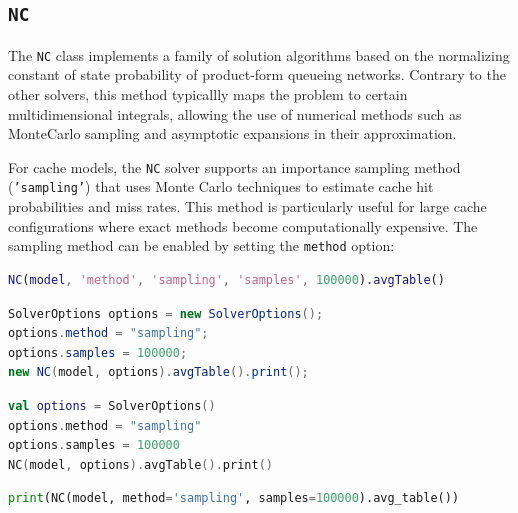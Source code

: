 \subsection{\texttt{NC}}
The \texttt{NC} class implements a family of solution algorithms based on the normalizing constant of state probability of product-form queueing networks. Contrary to the other solvers, this method typicallly maps the problem to certain multidimensional integrals, allowing the use of numerical methods such as MonteCarlo sampling and asymptotic expansions in their approximation.

For cache models, the \texttt{NC} solver supports an importance sampling method (\texttt{'sampling'}) that uses Monte Carlo techniques to estimate cache hit probabilities and miss rates. This method is particularly useful for large cache configurations where exact methods become computationally expensive. The sampling method can be enabled by setting the \texttt{method} option:
\begin{MATLAB}
\begin{lstlisting}[language = matlab]
NC(model, 'method', 'sampling', 'samples', 100000).avgTable()
\end{lstlisting}
\end{MATLAB}
\begin{JAVA}
\begin{lstlisting}[language=java, basicstyle=\ttfamily\scriptsize]
SolverOptions options = new SolverOptions();
options.method = "sampling";
options.samples = 100000;
new NC(model, options).avgTable().print();
\end{lstlisting}
\end{JAVA}
\begin{KOTLIN}
\begin{lstlisting}[language=kotlin, basicstyle=\ttfamily\scriptsize]
val options = SolverOptions()
options.method = "sampling"
options.samples = 100000
NC(model, options).avgTable().print()
\end{lstlisting}
\end{KOTLIN}
\begin{PYTHON}
\begin{lstlisting}[language=python, basicstyle=\ttfamily\scriptsize]
print(NC(model, method='sampling', samples=100000).avg_table())
\end{lstlisting}
\end{PYTHON}

